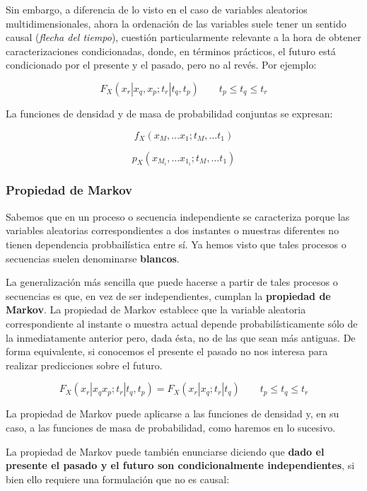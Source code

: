 \documentclass[11pt]{article}
\begin{document}
Sin embargo, a diferencia de lo visto en el caso de variables aleatorios
multidimensionales, ahora la ordenación de las variables suele tener un
sentido causal (\emph{flecha del tiempo}), cuestión particularmente
relevante a la hora de obtener caracterizaciones condicionadas, donde,
en términos prácticos, el futuro está condicionado por el presente y el
pasado, pero no al revés. Por ejemplo:

\[
F_X(x_r | x_q , x_p; t_r | t_q , t_p) \qquad t_p \leq t_q \leq t_r
\]

La funciones de densidad y de masa de probabilidad conjuntas se
expresan:

\[
f_X(x_M ,\ldots x_1 ; t_M , \ldots t_1)
\]

\[
p_X(x_{M_i} ,\ldots x_{1_i} ; t_M , \ldots t_1)
\]

    \hypertarget{propiedad-de-markov}{%
\subsubsection{Propiedad de Markov}\label{propiedad-de-markov}}

Sabemos que en un proceso o secuencia independiente se caracteriza
porque las variables aleatorias correspondientes a dos instantes o
muestras diferentes no tienen dependencia probbailística entre sí. Ya
hemos visto que tales procesos o secuencias suelen denominarse
\textbf{blancos}.

La generalización más sencilla que puede hacerse a partir de tales
procesos o secuencias es que, en vez de ser independientes, cumplan la
\textbf{propiedad de Markov}. La propiedad de Markov establece que la
variable aleatoria correspondiente al instante o muestra actual depende
probabilísticamente sólo de la inmediatamente anterior pero, dada ésta,
no de las que sean más antiguas. De forma equivalente, si conocemos el
presente el pasado no nos interesa para realizar predicciones sobre el
futuro.

\[
F_X(x_r | x_q x_p; t_r | t_q , t_p) = F_X(x_r | x_q ; t_r | t_q) \qquad t_p \leq t_q \leq t_r
\]

La propiedad de Markov puede aplicarse a las funciones de densidad y, en
su caso, a las funciones de masa de probabilidad, como haremos en lo
sucesivo.

    La propiedad de Markov puede también enunciarse diciendo que
\textbf{dado el presente el pasado y el futuro son condicionalmente
independientes}, si bien ello requiere una formulación que no es causal:
\end{document}
